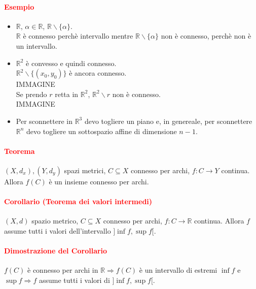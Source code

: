 \documentclass{article}
\newcommand{\R}{\mathbb{R}}
\begin{document}
\paragraph{\textcolor{red}{Esempio}}
\begin{itemize}
    \item $\R$, $\alpha \in \R$, $\R \backslash \{\alpha\}$.\\
    $\R$ è connesso perchè intervallo mentre $\R \backslash \{\alpha\}$ non è connesso, perchè non è un intervallo.
    \item $\R^2$ è convesso e quindi connesso.\\
    $\R^2\backslash \{(x_0,y_0)\}$ è ancora connesso.\\
    IMMAGINE\\
    Se prendo $r$ retta in $\R^2$, $\R^2\backslash r$ non è connesso.\\
    IMMAGINE
    \item Per sconnettere in $\R^3$ devo togliere un piano e, in genereale, per sconnettere $\R^n$ devo togliere un sottospazio affine di dimensione $n-1$.
\end{itemize}

\paragraph{\textcolor{red}{Teorema}}
$(X,d_x),(Y,d_y)$ spazi metrici, $C \subseteq X$ connesso per archi, $f: C \rightarrow Y$ continua. Allora $f(C)$ è un insieme connesso per archi.

\paragraph{\textcolor{red}{Corollario (Teorema dei valori intermedi)}}
$(X,d)$ spazio metrico, $C \subseteq X$ connesso per archi, $f:C \rightarrow \R$ continua. Allora $f$ assume tutti i valori dell'intervallo $]\inf f, \sup f[$.

\paragraph{\textcolor{red}{Dimostrazione del Corollario}}
$f(C)$ è connesso per archi in $\R \Rightarrow f(C)$ è un intervallo di estremi $\inf f$ e $\sup f \Rightarrow f$ assume tutti i valori di $]\inf f, \sup f[$.
\begin{flushright}
\large\Lightning
\end{flushright}
\end{document}
